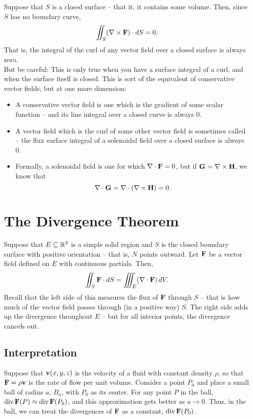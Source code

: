 Suppose that \(S\) is a closed surface – that it, it contains some volume. Then, since \(S\) has no boundary curve,
\[
    \iint_S (\nabla \times \mathbf{F}) \cdot dS = 0.
\]
That is, the integral of the curl of any vector field over a closed surface is always zero. \\

But be careful: This is only true when you have a surface integral of a curl, and when the surface itself is closed. This is sort of the equivalent of conservative vector fields, but at one more dimension:
\begin{itemize}
    \item A conservative vector field is one which is the gradient of some scalar function – and its line integral over a closed curve is always 0.
    \item A vector field which is the curl of some other vector field is sometimes called  – the flux surface integral of a solenoidal field over a closed surface is always 0.
    \item Formally, a solenoidal field is one for which \(\nabla \cdot \mathbf{F} = 0\), but if \(\mathbf{G} = \nabla \times \mathbf{H}\), we know that
    \[
        \nabla \cdot \mathbf{G} = \nabla \cdot (\nabla \times \mathbf{H}) = 0.
    \]
\end{itemize}

\newpage

\section{The Divergence Theorem}

Suppose that \(E \subseteq \mathbb{R}^{3}\) is a simple solid region and \(S\) is the closed boundary surface with positive orientation – that is, \(N\) points outward. Let \(\mathbf{F}\) be a vector field defined on \(E\) with continuous partials. Then,
\[
    \iint_S \mathbf{F} \cdot dS = \iiint_E (\nabla \cdot \mathbf{F}) \, dV.
\]
Recall that the left side of this measures the flux of \(\mathbf{F}\) through \(S\) – that is how much of the vector field passes through (in a positive way) \(S\). The right side adds up the divergence throughout \(E\) – but for all interior points, the divergence cancels out.

\subsection{Interpretation}

Suppose that \(\mathbf{v}(x,y,z)\) is the velocity of a fluid with constant density \(\rho\), so that \(\mathbf{F} = \rho\mathbf{v}\) is the rate of flow per unit volume. Consider a point \(P_0\) and place a small ball of radius \(a\), \(B_a\), with \(P_0\) as its center. For any point \(P\) in the ball, \(\text{div} \, \mathbf{F}(P) \approx \text{div} \, \mathbf{F}(P_0)\), and this approximation gets better as \(a \to 0\). Thus, in the ball, we can treat the divergences of \(\mathbf{F}\) as a constant, \(\text{div} \, \mathbf{F}(P_0)\). \\


